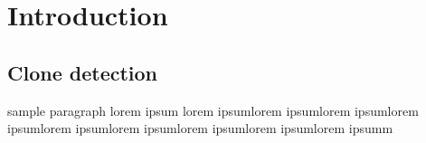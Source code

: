 \chapter{Introduction}
\section{Clone detection}
sample paragraph
\newpage
lorem ipsum lorem ipsumlorem ipsumlorem ipsumlorem ipsumlorem ipsumlorem ipsumlorem ipsumlorem ipsumlorem ipsumm
